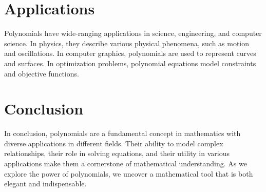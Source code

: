 \documentclass{article}
\begin{document}
\section*{Applications}
Polynomials have wide-ranging applications in science, engineering, and computer science. In physics, they describe various physical phenomena, such as motion and oscillations. In computer graphics, polynomials are used to represent curves and surfaces. In optimization problems, polynomial equations model constraints and objective functions.

\section*{Conclusion}
In conclusion, polynomials are a fundamental concept in mathematics with diverse applications in different fields. Their ability to model complex relationships, their role in solving equations, and their utility in various applications make them a cornerstone of mathematical understanding. As we explore the power of polynomials, we uncover a mathematical tool that is both elegant and indispensable.
\end{document}
